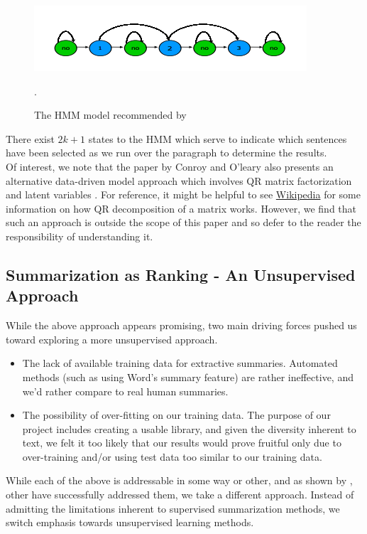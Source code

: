 \documentclass[11pt]{article}
\begin{document}
\begin{figure}[h!]
\centering
\includegraphics[]{hmm_model}
\caption{The HMM model recommended by \cite{hmm_summary}}.
\label{fig:hmm_model}
\end{figure}
There exist $2k+1$ states to the HMM which serve to indicate which sentences have been selected as we run over the paragraph to determine the results. \\

Of interest, we note that the paper by Conroy and O'leary also presents an alternative data-driven model approach which involves QR matrix factorization and latent variables \cite{hmm_summary}. For reference, it might be helpful to see \href{https://en.wikipedia.org/wiki/QR_decomposition}{Wikipedia} for some information on how QR decomposition of a matrix works. However, we find that such an approach is outside the scope of this paper and so defer to the reader the responsibility of understanding it.

\subsection{Summarization as Ranking - An Unsupervised Approach}
While the above approach appears promising, two main driving forces pushed us toward exploring a more unsupervised approach.
\begin{itemize}
\item The lack of available training data for extractive summaries. Automated methods (such as using Word's summary feature) are rather ineffective, and we'd rather compare to real human summaries.
\item The possibility of over-fitting on our training data. The purpose of our project includes creating a usable library, and given the diversity inherent to text, we felt it too likely that our results would prove fruitful only due to over-training and/or using test data too similar to our training data.
\end{itemize}

While each of the above is addressable in some way or other, and as shown by \cite{survey}, other have successfully addressed them, we take a different approach. Instead of admitting the limitations inherent to supervised summarization methods, we switch emphasis towards unsupervised learning methods.
\end{document}

